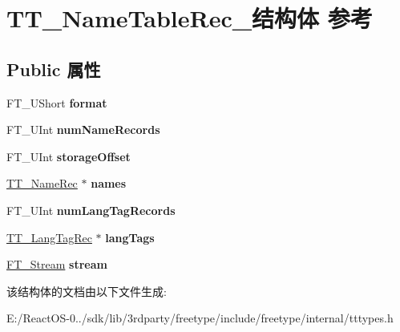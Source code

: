 \hypertarget{struct_t_t___name_table_rec__}{}\section{T\+T\+\_\+\+Name\+Table\+Rec\+\_\+结构体 参考}
\label{struct_t_t___name_table_rec__}
\subsection*{Public 属性}
\begin{DoxyCompactItemize}
\item 
\mbox{\label{struct_t_t___name_table_rec___a762c5431cbe285cb7153bb5650710fb0}} 
F\+T\+\_\+\+U\+Short {\bfseries format}
\item 
\mbox{\label{struct_t_t___name_table_rec___a5b565d940b9d02bb69cd19da5cda61b8}} 
F\+T\+\_\+\+U\+Int {\bfseries num\+Name\+Records}
\item 
\mbox{\label{struct_t_t___name_table_rec___a4ed1f4e78e39b2e206411e9ea4d23801}} 
F\+T\+\_\+\+U\+Int {\bfseries storage\+Offset}
\item 
\mbox{\label{struct_t_t___name_table_rec___a1248b355fa4be5b145fa5ab25dfc45e0}} 
\hyperlink{struct_t_t___name_rec__}{T\+T\+\_\+\+Name\+Rec} $\ast$ {\bfseries names}
\item 
\mbox{\label{struct_t_t___name_table_rec___a6ead4d36b4298e4385188c152856fb66}} 
F\+T\+\_\+\+U\+Int {\bfseries num\+Lang\+Tag\+Records}
\item 
\mbox{\label{struct_t_t___name_table_rec___a4a7542d8432ab2797b5ec5bcf0f7ad8a}} 
\hyperlink{struct_t_t___lang_tag_rec__}{T\+T\+\_\+\+Lang\+Tag\+Rec} $\ast$ {\bfseries lang\+Tags}
\item 
\mbox{\label{struct_t_t___name_table_rec___a97109aec8cd7ca13f6627f3fee15d48d}} 
\hyperlink{struct_f_t___stream_rec__}{F\+T\+\_\+\+Stream} {\bfseries stream}
\end{DoxyCompactItemize}


该结构体的文档由以下文件生成\+:\begin{DoxyCompactItemize}
\item 
E\+:/\+React\+O\+S-\/0../sdk/lib/3rdparty/freetype/include/freetype/internal/tttypes.\+h\end{DoxyCompactItemize}
